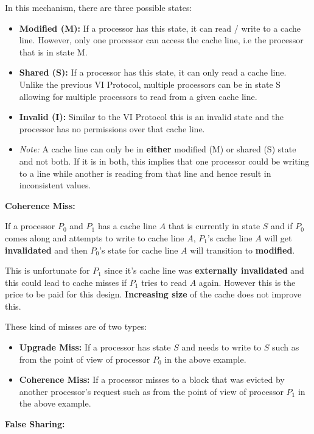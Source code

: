 \documentclass[12pt]{article}
\newenvironment{QandA}{\begin{enumerate}[label=\bfseries\arabic*.]\bfseries}
                      {\end{enumerate}}
\newenvironment{answered}{\par\quad\normalfont}{}
\begin{document}
\begin{QandA}
\begin{answered}
In this mechanism, there are three possible states:
\begin{itemize}
    \item \textbf{Modified (M):} If a processor has this state, it can read / write to a cache line. However, only one processor can access the cache line, i.e the processor that is in state M.
    \item \textbf{Shared (S):} If a processor has this state, it can only read a cache line. Unlike the previous VI Protocol, multiple processors can be in state S allowing for multiple processors to read from a given cache line.
    \item \textbf{Invalid (I):} Similar to the VI Protocol this is an invalid state and the processor has no permissions over that cache line.
    \item \textit{Note:} A cache line can only be in \textbf{either} modified (M) or shared (S) state and not both. If it is in both, this implies that one processor could be writing to a line while another is reading from that line and hence result in inconsistent values. 
\end{itemize}

\textbf{Coherence Miss:}

If a processor $P_{0}$ and $P_{1}$ has a cache line $A$ that is currently in state $S$ and if $P_{0}$ comes along and attempts to write to cache line $A$, $P_{1}$'s cache line $A$ will get \textbf{invalidated} and then $P_{0}$'s state for cache line $A$ will transition to \textbf{modified}. 

This is unfortunate for $P_{1}$ since it's cache line was \textbf{externally invalidated} and this could lead to cache misses if $P_{1}$ tries to read $A$ again. However this is the price to be paid for this design. \textbf{Increasing size} of the cache does not improve this.

These kind of misses are of two types:
\begin{itemize}
    \item \textbf{Upgrade Miss:} If a processor has state $S$ and needs to write to $S$ such as from the point of view of processor $P_{0}$ in the above example.
    \item \textbf{Coherence Miss:} If a processor misses to a block that was evicted by another processor's request such as from the point of view of processor $P_{1}$ in the above example. 
\end{itemize}

\textbf{False Sharing:}


\end{answered}
\end{QandA}
\end{document}
